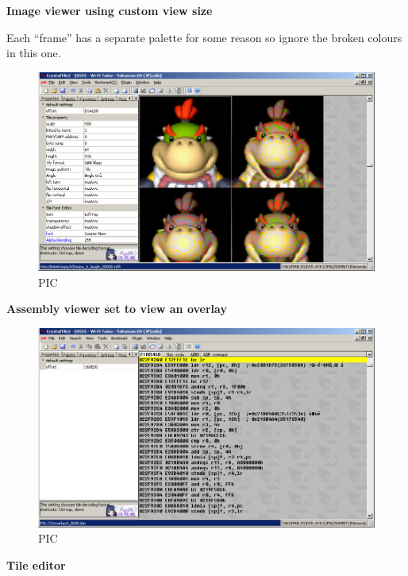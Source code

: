 \documentclass[
]{book}
\begin{document}
\textbf{Image viewer using custom view size}

Each ``frame'' has a separate palette for some reason so ignore the broken colours in this one.

\begin{figure}
\centering
\includegraphics{images/223_home_fast6191_romhackingguide_unrenamed_fil___inal_borders_romhackguidecrystaltile2usage4.png}
\caption{PIC}
\end{figure}

\textbf{Assembly viewer set to view an overlay}

\begin{figure}
\centering
\includegraphics{images/224_home_fast6191_romhackingguide_unrenamed_fil___inal_borders_romhackguidecrystaltile2usage5.png}
\caption{PIC}
\end{figure}

\textbf{Tile editor}
\end{document}
